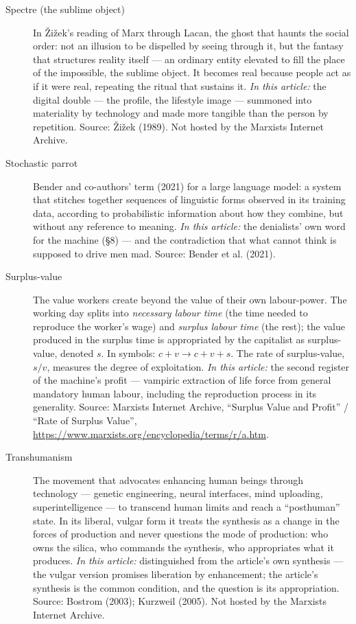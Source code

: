 \documentclass[11pt]{article}
\begin{document}
\begin{description}
\item[Spectre (the sublime object)] In \v{Z}i\v{z}ek's reading of Marx
through Lacan, the ghost that haunts the social order: not an illusion
to be dispelled by seeing through it, but the fantasy that structures
reality itself --- an ordinary entity elevated to fill the place of the
impossible, the sublime object. It becomes real because people act as
if it were real, repeating the ritual that sustains it. \emph{In this
article:} the digital double --- the profile, the lifestyle image ---
summoned into materiality by technology and made more tangible than the
person by repetition. Source: \v{Z}i\v{z}ek (1989). Not hosted by the
Marxists Internet Archive.

\item[Stochastic parrot] Bender and co-authors' term (2021) for a large
language model: a system that stitches together sequences of linguistic
forms observed in its training data, according to probabilistic
information about how they combine, but without any reference to
meaning. \emph{In this article:} the denialists' own word for the
machine (§8) --- and the contradiction that what cannot think is
supposed to drive men mad. Source: Bender et al. (2021).

\item[Surplus-value] The value workers create beyond the value of their
own labour-power. The working day splits into \emph{necessary labour
time} (the time needed to reproduce the worker's wage) and
\emph{surplus labour time} (the rest); the value produced in the
surplus time is appropriated by the capitalist as surplus-value,
denoted $s$. In symbols: $c + v \to c + v + s$. The rate of
surplus-value, $s/v$, measures the degree of exploitation. \emph{In
this article:} the second register of the machine's profit --- vampiric
extraction of life force from general mandatory human labour, including
the reproduction process in its generality. Source: Marxists Internet
Archive, ``Surplus Value and Profit'' / ``Rate of Surplus Value'',
\url{https://www.marxists.org/encyclopedia/terms/r/a.htm}.

\item[Transhumanism] The movement that advocates enhancing human beings
through technology --- genetic engineering, neural interfaces, mind
uploading, superintelligence --- to transcend human limits and reach a
``posthuman'' state. In its liberal, vulgar form it treats the synthesis
as a change in the forces of production and never questions the mode of
production: who owns the silica, who commands the synthesis, who
appropriates what it produces. \emph{In this article:} distinguished
from the article's own synthesis --- the vulgar version promises
liberation by enhancement; the article's synthesis is the common
condition, and the question is its appropriation. Source: Bostrom
(2003); Kurzweil (2005). Not hosted by the Marxists Internet Archive.
\end{description}
\end{document}
